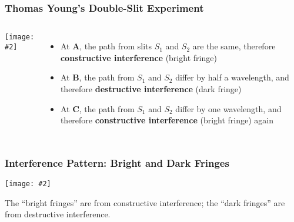 \documentclass[compress,aspectratio=169]{beamer}
\newcommand{\pic}[2]{\texttt{[image: \#2]}}
\begin{document}
\begin{frame}
  \frametitle{Thomas Young's Double-Slit Experiment}
  \begin{columns}
    \pic{1.2}{path1.png}
    \begin{itemize}
    \item At \textbf{A}, the path from slits $S_1$ and $S_2$ are the same,
      therefore \textbf{constructive interference} (bright fringe)
    \item At \textbf{B}, the path from $S_1$ and $S_2$ differ by half a
      wavelength, and therefore \textbf{destructive interference} (dark fringe)
    \item At \textbf{C}, the path from $S_1$ and $S_2$ differ by one
      wavelength, and therefore \textbf{constructive interference} (bright
      fringe) again
    \end{itemize}
  \end{columns}
\end{frame}

\begin{frame}
  \frametitle{Interference Pattern: Bright and Dark Fringes}
  \begin{center}
    \pic{.4}{fringes1.png}
  \end{center}
  The ``bright fringes'' are from constructive interference; the ``dark
  fringes'' are from destructive interference.
\end{frame}
\end{document}
